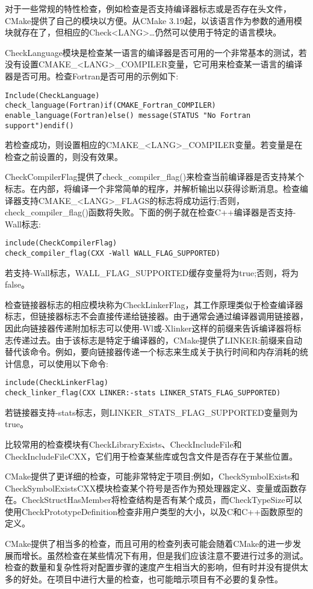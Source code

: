 
对于一些常规的特性检查，例如检查是否支持编译器标志或是否存在头文件，CMake提供了自己的模块以方便。从CMake 3.19起，以该语言作为参数的通用模块就存在了，但相应的Check<LANG>…仍然可以使用于特定的语言模块。

CheckLanguage模块是检查某一语言的编译器是否可用的一个非常基本的测试，若没有设置CMAKE\_<LANG>\_COMPILER变量，它可用来检查某一语言的编译器是否可用。检查Fortran是否可用的示例如下:

\begin{lstlisting}[style=styleCMake]
Include(CheckLanguage)
check_language(Fortran)if(CMAKE_Fortran_COMPILER)
enable_language(Fortran)else() message(STATUS "No Fortran
support")endif()
\end{lstlisting}

若检查成功，则设置相应的CMAKE\_<LANG>\_COMPILER变量。若变量是在检查之前设置的，则没有效果。

CheckCompilerFlag提供了check\_compiler\_flag()来检查当前编译器是否支持某个标志。在内部，将编译一个非常简单的程序，并解析输出以获得诊断消息。检查编译器支持CMAKE\_<LANG>\_FLAGS的标志将成功运行;否则，check\_compiler\_flag()函数将失败。下面的例子就在检查C++编译器是否支持-Wall标志:

\begin{lstlisting}[style=styleCMake]
include(CheckCompilerFlag)
check_compiler_flag(CXX -Wall WALL_FLAG_SUPPORTED)
\end{lstlisting}

若支持-Wall标志，WALL\_FLAG\_SUPPORTED缓存变量将为true;否则，将为false。

检查链接器标志的相应模块称为CheckLinkerFlag，其工作原理类似于检查编译器标志，但链接器标志不会直接传递给链接器。由于通常会通过编译器调用链接器，因此向链接器传递附加标志可以使用-Wl或-Xlinker这样的前缀来告诉编译器将标志传递过去。由于该标志是特定于编译器的，CMake提供了LINKER:前缀来自动替代该命令。例如，要向链接器传递一个标志来生成关于执行时间和内存消耗的统计信息，可以使用以下命令:

\begin{lstlisting}[style=styleCMake]
include(CheckLinkerFlag)
check_linker_flag(CXX LINKER:-stats LINKER_STATS_FLAG_SUPPORTED)
\end{lstlisting}

若链接器支持-stats标志，则LINKER\_STATS\_FLAG\_SUPPORTED变量则为true。

比较常用的检查模块有CheckLibraryExists、CheckIncludeFile和CheckIncludeFileCXX，它们用于检查某些库或包含文件是否存在于某些位置。

CMake提供了更详细的检查，可能非常特定于项目;例如，CheckSymbolExists和CheckSymbolExistsCXX模块检查某个符号是否作为预处理器定义、变量或函数存在。CheckStructHasMember将检查结构是否有某个成员，而CheckTypeSize可以使用CheckPrototypeDefinition检查非用户类型的大小，以及C和C++函数原型的定义。

CMake提供了相当多的检查，而且可用的检查列表可能会随着CMake的进一步发展而增长。虽然检查在某些情况下有用，但是我们应该注意不要进行过多的测试。检查的数量和复杂性将对配置步骤的速度产生相当大的影响，但有时并没有提供太多的好处。在项目中进行大量的检查，也可能暗示项目有不必要的复杂性。
